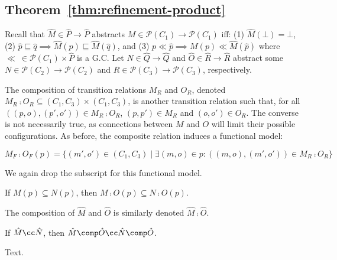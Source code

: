\subsection{Theorem~\ref{thm:refinement-product}}

Recall that $\hat M \in \hat P \rightarrow \hat P$ abstracts $M \in \mathcal{P}(C_{1}) \rightarrow \mathcal{P}(C_{1})$ iff: (1) $\hat M(\bot) = \bot$, (2) $\hat p \sqsubseteq \hat q \implies \hat M(\hat p) \sqsubseteq \hat M(\hat q)$, and (3) $p \ll \hat p \implies M(p) \ll \hat M(\hat p)$ where $\ll \: \in \mathcal{P}(C_{1}) \times \hat P$ is a G.C. Let $\hat N \in \hat Q \rightarrow \hat Q$ and $\hat O \in \hat R \rightarrow \hat R$ abstract some $N \in \mathcal{P}(C_{2}) \rightarrow \mathcal{P}(C_{2})$ and $R \in \mathcal{P}(C_{3}) \rightarrow \mathcal{P}(C_{3})$, respectively.

The composition of transition relations $M_{R}$ and $O_{R}$, denoted $M_{R} \comp O_{R} \subseteq (C_{1},C_{3}) \times (C_{1},C_{3})$, is another transition relation such that, for all $((p,o),(p',o')) \in M_{R} \comp O_{R}$, $(p,p') \in M_{R}$ and $(o,o') \in O_{R}$. The converse is not necessarily true, as connections between $M$ and $O$ will limit their possible configurations. As before, the composite relation induces a functional model:

\begin{equation*}
M_{F} \comp O_{F} (p) = \{ (m',o') \in (C_{1},C_{3}) \mid \exists (m,o) \in p : ((m,o),(m',o')) \in M_{R} \comp O_{R} \}
\end{equation*}

\noindent We again drop the subscript for this functional model.

\begin{lemma}
If $M(p) \subseteq N(p)$, then $M \comp O(p) \subseteq N \comp O(p)$.
\end{lemma}

The composition of $\hat M$ and $\hat O$ is similarly denoted $\hat M \comp \hat O$.

\begin{lemma}
If $\hat M \cc \hat N$, then $\hat M \comp \hat O \cc \hat N \comp \hat O$.
\end{lemma}

Text.



